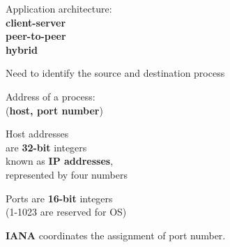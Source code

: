 \begin{frame}\begin{center}\large
	Application architecture: \\
		\textbf{client-server}\\
		\textbf{peer-to-peer}\\
		\textbf{hybrid}\\
\end{center}\end{frame}

\begin{frame}\begin{center}\large
	Need to identify the source and destination process
\end{center}\end{frame}

\begin{frame}\begin{center}\large
	Address of a process:\\
		(\textbf{host, port number})
\end{center}\end{frame}

\begin{frame}\begin{center}\large
	Host addresses\\ are \textbf{32-bit} integers\\
	known as \textbf{IP addresses},\\
	represented by four numbers
\end{center}\end{frame}

\begin{frame}\begin{center}\large
	Ports are \textbf{16-bit} integers\\
	(1-1023 are reserved for OS)
\end{center}\end{frame}

\begin{frame}\begin{center}\large
	\textbf{IANA} coordinates the assignment of port number.
\end{center}\end{frame}

